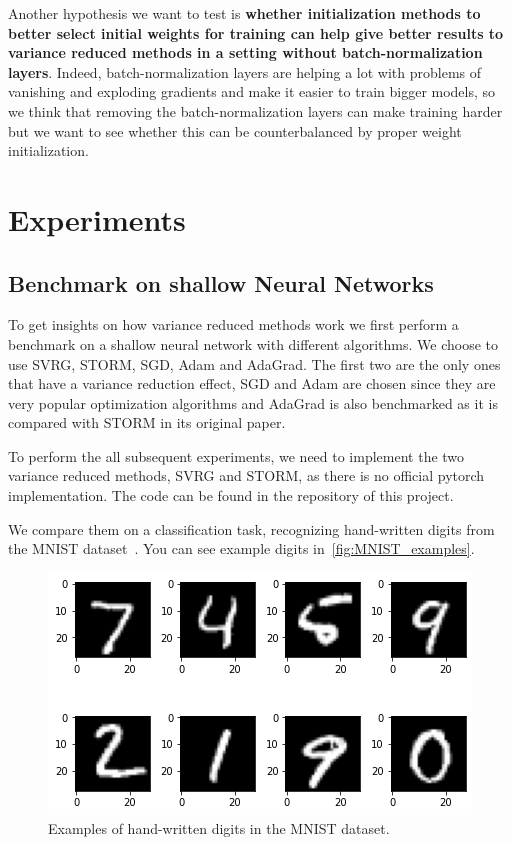 \documentclass[a4paper,11pt,oneside]{report}
\begin{document}
Another hypothesis we want to test is \textbf{whether initialization methods to better select initial weights for training can help give better results to variance reduced methods in a setting without batch-normalization layers}. Indeed, batch-normalization layers are helping a lot with problems of vanishing and exploding gradients and make it easier to train bigger models, so we think that removing the batch-normalization layers can make training harder but we want to see whether this can be counterbalanced by proper weight initialization.


\chapter{Experiments}
\section{Benchmark on shallow Neural Networks}
To get insights on how variance reduced methods work we first perform a benchmark on a shallow neural network with different algorithms. We choose to use SVRG, STORM, SGD, Adam and AdaGrad. The first two are the only ones that have a variance reduction effect, SGD and Adam are chosen since they are very popular optimization algorithms and AdaGrad is also benchmarked as it is compared with STORM in its original paper. 

To perform the all subsequent experiments, we need to implement the two variance reduced methods, SVRG and STORM, as there is no official pytorch implementation. The code can be found in the repository of this project.

We compare them on a classification task, recognizing hand-written digits from the MNIST dataset~\cite{lecun2010mnist}. You can see example digits in~\autoref{fig:MNIST_examples}. 

\begin{figure}
    \centering
    \includegraphics[scale=0.5]{figures/MNIST_example.png}
    \caption{Examples of hand-written digits in the MNIST dataset.}
    \label{fig:MNIST_examples}
\end{figure}
\end{document}
